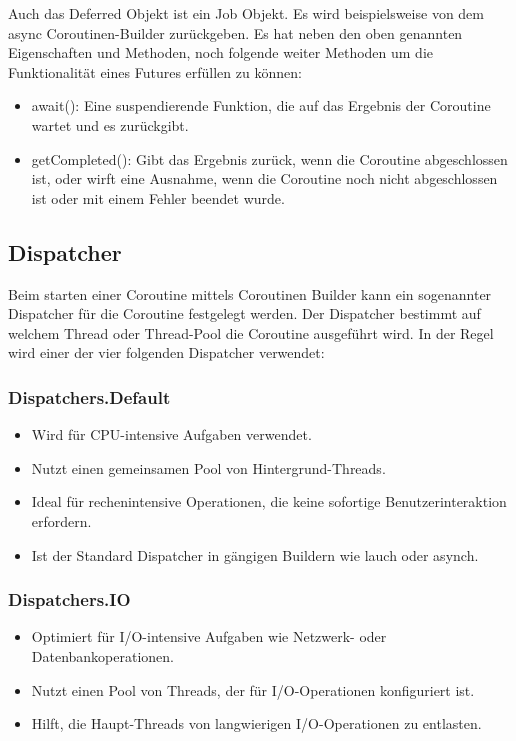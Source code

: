 \documentclass[fontsize=12pt,paper=a4,twoside=semi,parskip=half-,headsepline,headinclude]{scrreprt}
\begin{document}
Auch das Deferred Objekt ist ein Job Objekt. Es wird beispielsweise von dem async Coroutinen-Builder zurückgeben. Es hat neben den oben genannten Eigenschaften und Methoden, noch folgende weiter Methoden um die Funktionalität eines Futures erfüllen zu können:

\begin{itemize}
	\item await(): Eine suspendierende Funktion, die auf das Ergebnis der Coroutine wartet und es zurückgibt.
	\item getCompleted(): Gibt das Ergebnis zurück, wenn die Coroutine abgeschlossen ist, oder wirft eine Ausnahme, wenn die Coroutine noch nicht abgeschlossen ist oder mit einem Fehler beendet wurde.
\end{itemize}

\subsection{Dispatcher}

Beim starten einer Coroutine mittels Coroutinen Builder kann ein sogenannter Dispatcher für die Coroutine festgelegt werden. Der Dispatcher bestimmt auf welchem Thread oder Thread-Pool die Coroutine ausgeführt wird. In der Regel wird einer der vier folgenden Dispatcher verwendet:

\subsubsection{Dispatchers.Default}

\begin{itemize}
	\item Wird für CPU-intensive Aufgaben verwendet.
	\item Nutzt einen gemeinsamen Pool von Hintergrund-Threads.
	\item Ideal für rechenintensive Operationen, die keine sofortige Benutzerinteraktion erfordern.
	\item Ist der Standard Dispatcher in gängigen Buildern wie lauch oder asynch.
\end{itemize}

\subsubsection{Dispatchers.IO}

\begin{itemize}
	\item Optimiert für I/O-intensive Aufgaben wie Netzwerk- oder Datenbankoperationen.
	\item Nutzt einen Pool von Threads, der für I/O-Operationen konfiguriert ist.
	\item Hilft, die Haupt-Threads von langwierigen I/O-Operationen zu entlasten.
\end{itemize}
\end{document}
